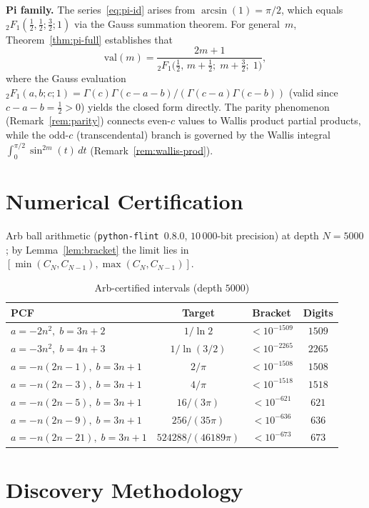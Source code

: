 \documentclass[11pt,a4paper]{article}
\theoremstyle{plain}
\theoremstyle{remark}
\begin{document}
\textbf{Pi family.}
The series~\eqref{eq:pi-id} arises from $\arcsin(1)=\pi/2$,
which equals ${}_2F_1(\frac12,\frac12;\frac32;1)$ via the Gauss summation theorem.
For general~$m$, Theorem~\ref{thm:pi-full} establishes that
\[
  \mathrm{val}(m)
  = \frac{2m{+}1}
         {{}_2F_1\!\bigl(\tfrac12,\,m{+}\tfrac12;\;m{+}\tfrac32;\;1\bigr)},
\]
where the Gauss evaluation
${}_2F_1(a,b;c;1) = \Gamma(c)\Gamma(c{-}a{-}b)/(\Gamma(c{-}a)\Gamma(c{-}b))$
(valid since $c - a - b = \frac12 > 0$) yields the closed form directly.
The parity phenomenon (Remark~\ref{rem:parity}) connects even-$c$
values to Wallis product partial products, while the odd-$c$
(transcendental) branch is governed by the Wallis integral
$\int_0^{\pi/2}\sin^{2m}(t)\,dt$
(Remark~\ref{rem:wallis-prod}).

\section{Numerical Certification}\label{sec:cert}

Arb ball arithmetic (\texttt{python-flint}~0.8.0, $10\,000$-bit precision)
at depth $N{=}5000$; by Lemma~\ref{lem:bracket}
the limit lies in $[\min(C_N,C_{N-1}),\max(C_N,C_{N-1})]$.

\begin{table}[h]
\centering
\caption{Arb-certified intervals (depth $5000$)}\label{tab:cert}
\begin{tabular}{@{}lccc@{}}
\toprule
PCF & Target & Bracket & Digits \\
\midrule
$a=-2n^2,\;b=3n{+}2$      & $1/\ln 2$    & $<10^{-1509}$ & $1509$ \\
$a=-3n^2,\;b=4n{+}3$      & $1/\ln(3/2)$ & $<10^{-2265}$ & $2265$ \\
$a=-n(2n{-}1),\;b=3n{+}1$ & $2/\pi$      & $<10^{-1508}$ & $1508$ \\
$a=-n(2n{-}3),\;b=3n{+}1$ & $4/\pi$      & $<10^{-1518}$ & $1518$ \\
$a=-n(2n{-}5),\;b=3n{+}1$ & $16/(3\pi)$  & $<10^{-621}$  & $621$ \\
$a=-n(2n{-}9),\;b=3n{+}1$ & $256/(35\pi)$& $<10^{-636}$  & $636$ \\
$a=-n(2n{-}21),\;b=3n{+}1$& $524288/(46189\pi)$ & $<10^{-673}$ & $673$ \\
\bottomrule
\end{tabular}
\end{table}

\section{Discovery Methodology}
\end{document}
